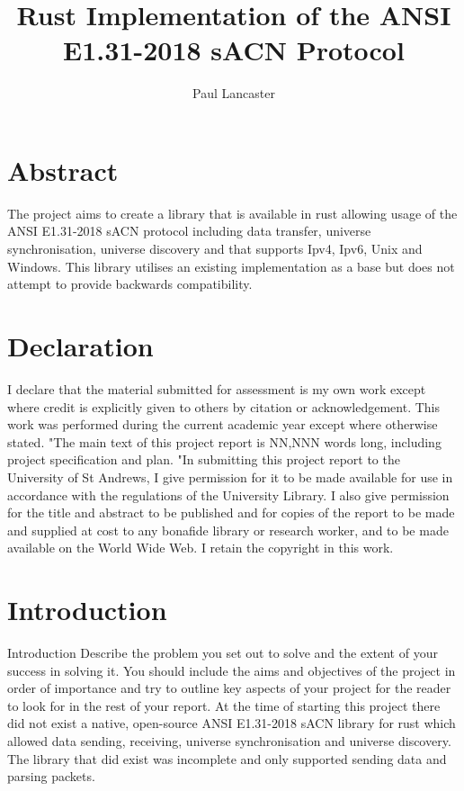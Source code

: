 \documentclass[11pt,a4paper]{report}
\author{Paul Lancaster}
\title{Rust Implementation of the ANSI E1.31-2018 sACN Protocol}
\begin{document}
	
	
	\section{Abstract}
	The project aims to create a library that is available in rust allowing usage of the ANSI E1.31-2018 sACN \cite{ANSI_E1.31} protocol including data transfer, universe synchronisation, universe discovery and that supports Ipv4, Ipv6, Unix and Windows. This library utilises an existing implementation \cite{ORIGINAL_IMPL} as a base but does not attempt to provide backwards compatibility.
	
	\section{Declaration}
	I declare that the material submitted for
	assessment is my own work except where credit is
	explicitly given to others by citation or
	acknowledgement. This work was performed during
	the current academic year except where otherwise
	stated.
	"The main text of this project report is NN,NNN
	words long, including project specification and plan.
	"In submitting this project report to the University of
	St Andrews, I give permission for it to be made
	available for use in accordance with the regulations of the University Library. I also give permission for
	the title and abstract to be published and for copies of the report to be made and supplied at cost to any bonafide library or research worker, and to be made
	available on the World Wide Web. I retain the
	copyright in this work.
	
	
	\tableofcontents
	\pagebreak
	
	\section{Introduction}
		Introduction
		Describe the problem you set out to solve and the
		extent of your success in solving it. You should include
		the aims and objectives of the project in order of
		importance and try to outline key aspects of your
		project for the reader to look for in the rest of your
		report.
	At the time of starting this project there did not exist a native, open-source ANSI E1.31-2018 sACN library for rust which allowed data sending, receiving, universe synchronisation and universe discovery.  The library that did exist was incomplete and only supported sending data and parsing packets.\\
	
\end{document}
